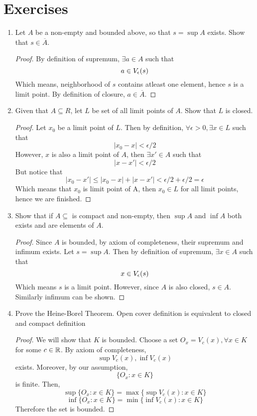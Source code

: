 \section{Exercises}
\begin{enumerate}
    \item Let $A$ be a non-empty and bounded above, so that $s = \sup A$ exists. Show that $s \in \overline{A}$.
        \begin{proof}
            By definition of supremum, $\exists a \in A$ such that
            \[ a \in V_{\epsilon}(s)\]
            Which means, neighborhood of $s$ contains atleast one element, hence $s$ is a limit point. By definition of closure, $a \in \overline{A}$.
        \end{proof}
    \item  Given that $A \subseteq R$, let $L$ be set of all limit points of $A$. Show that $L$ is closed.
        \begin{proof}
            Let $x_0$ be a limit point of $L$. Then by definition, $\forall \epsilon > 0, \exists x \in L$ such that
            \[ |x_0 - x| < \epsilon/2\]
            However, $x$ is also a limit point of $A$, then $\exists x' \in A$ such that
            \[ |x - x'| < \epsilon/2\]
            But notice that
            \[ |x_0 - x'| \le |x_0 - x| + |x - x'| < \epsilon/2 + \epsilon/2 = \epsilon\]
            Which means that $x_0$ is limit point of A, then $x_0 \in L$ for all limit points, hence we are finished.
        \end{proof}
    \item Show that if $A \subseteq$ is compact and non-empty, then $\sup A$ and $\inf A$ both exists and are elements of $A$.
        \begin{proof}
            Since $A$ is bounded, by axiom of completeness, their supremum and infimum exists. Let $s = \sup A$. Then by definition of supremum, $ \exists x \in A$ such that
            \[ x \in V_{\epsilon}(s)\]
            Which means $s$ is a limit point. However, since $A$ is also closed, $s \in A$. Similarly infimum can be shown.
        \end{proof}
    \item Prove the Heine-Borel Theorem. Open cover definition is equivalent to closed and compact definition
    \begin{proof}
        We will show that $K$ is bounded.
        Choose a set $O_x = V_{c}(x),\forall x \in K$ for some $c \in {\mathbb{R}}$. By axiom of completeness,
        \[ \sup V_c(x), \inf V_c(x)\]
        exists. Moreover, by our assumption,
        \[ \{ O_x : x \in K\}\]
        is finite. Then,
        \[\sup \{ O_x : x \in K\} = \max \{ \sup V_c(x) : x \in K \} \]
        \[\inf \{ O_x : x \in K\} = \min \{ \inf V_c(x) : x \in K \} \]
        Therefore the set is bounded.


\end{proof}
\end{enumerate}

